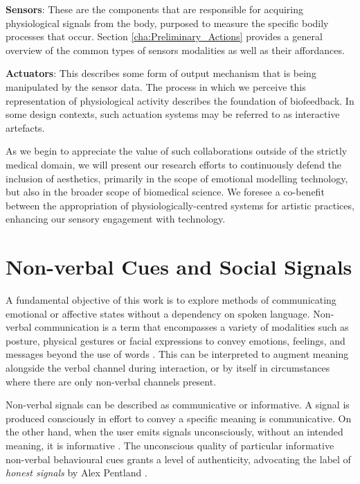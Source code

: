 \textbf{Sensors}: These are the components that are responsible for acquiring physiological signals from the body, purposed to measure the specific bodily processes that occur. Section \ref{cha:Preliminary_Actions} provides a general overview of the common types of sensors modalities as well as their affordances.

\textbf{Actuators}: This describes some form of output mechanism that is being manipulated by the sensor data. The process in which we perceive this representation of physiological activity describes the foundation of biofeedback. In some design contexts, such actuation systems may be referred to as interactive artefacts.

As we begin to appreciate the value of such collaborations outside of the strictly medical domain, we will present our research efforts to continuously defend the inclusion of aesthetics, primarily in the scope of emotional modelling technology, but also in the broader scope of biomedical science. We foresee a co-benefit between the appropriation of physiologically-centred systems for artistic practices, enhancing our sensory engagement with technology.


\section{Non-verbal Cues and Social Signals}

A fundamental objective of this work is to explore methods of communicating emotional or affective states without a dependency on spoken language. Non-verbal communication is a term that encompasses a variety of modalities such as posture, physical gestures or facial expressions to convey emotions, feelings, and messages beyond the use of words \cite{knapp_nonverbal_2009, richmond_nonverbal_2011}. This can be interpreted to augment meaning alongside the verbal channel during interaction, or by itself in circumstances where there are only non-verbal channels present.

Non-verbal signals can be described as communicative or informative. A signal is produced consciously in effort to convey a specific meaning is communicative. On the other hand, when the user emits signals unconsciously, without an intended meaning, it is informative \cite{vinciarelli_towards_2011}. The unconscious quality of particular informative non-verbal behavioural cues grants a level of authenticity, advocating the label of \textit{honest signals} by Alex Pentland \cite{pentland_honest_2010}.

